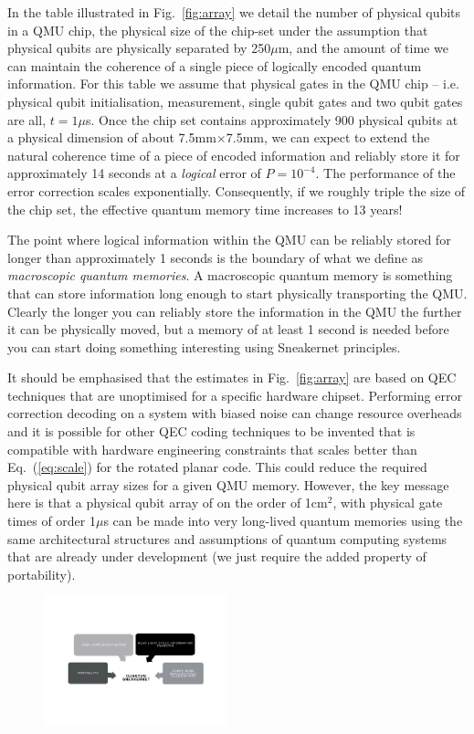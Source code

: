 \documentclass[twocolumn, aps, rmp, amsmath, amssymb, nofootinbib, superscriptaddress, longbibliography, floatfix, table-of-contents, eqsecnum]{revtex4-2}
\begin{document}
In the table illustrated in Fig.~\ref{fig:array} we detail the number of physical qubits in a QMU chip, the physical size of the chip-set under the assumption that physical qubits are physically separated by 250$\mu$m, and the amount of time we can maintain the coherence of a single piece of logically encoded quantum information. For this table we assume that physical gates in the QMU chip -- i.e. physical qubit initialisation, measurement, single qubit gates and two qubit gates are all, $t = 1\mu$s. Once the chip set contains approximately 900 physical qubits at a physical dimension of about 7.5mm$\times$7.5mm, we can expect to extend the natural coherence time of a piece of encoded information and reliably store it for approximately 14 seconds at a \textit{logical} error of $P= 10^{-4}$. The performance of the error correction scales exponentially. Consequently, if we roughly triple the size of the chip set, the effective quantum memory time increases to 13 years!

The point where logical information within the QMU can be reliably stored for longer than approximately 1 seconds is the boundary of what we define as \textit{macroscopic quantum memories}. A macroscopic quantum memory is something that can store information long enough to start physically transporting the QMU. Clearly the longer you can reliably store the information in the QMU the further it can be physically moved, but a memory of at least 1 second is needed before you can start doing something interesting using Sneakernet principles.

It should be emphasised that the estimates in Fig.~\ref{fig:array} are based on QEC techniques that are unoptimised for a specific hardware chipset. Performing error correction decoding on a system with biased noise can change resource overheads and it is possible for other QEC coding techniques to be invented that is compatible with hardware engineering constraints that scales better than Eq.~(\ref{eq:scale}) for the rotated planar code. This could reduce the required physical qubit array sizes for a given QMU memory. However, the key message here is that a physical qubit array of on the order of 1cm$^2$, with physical gate times of order 1$\mu$s can be made into very long-lived quantum memories using the same architectural structures and assumptions of quantum computing systems that are already under development (we just require the added property of portability). 

\begin{figure}[htbp!]
	\includegraphics[clip=true, width=0.475\textwidth]{goal}
	\caption{} \label{fig:goal}
\end{figure}
\end{document}
